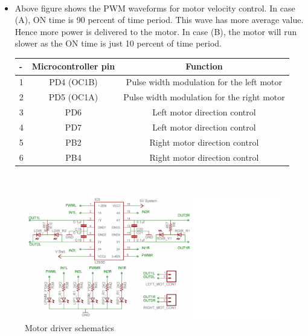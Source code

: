 \documentclass[a4paper,12pt,oneside]{book}
\begin{document}
	\hfill\\
	\begin{itemize}
	\item {Above figure shows the PWM waveforms for motor velocity control. In case (A), ON time is 90 percent of time period. This wave has more average value. Hence more power is delivered to the
	motor. In case (B), the motor will run slower as the ON time is just 10 percent of time period.}

	\begin{tabular*}{\textwidth}{|l|c|c|}
	\hline
	- & Microcontroller pin & Function \\
	\hline
	1 & PD4 (OC1B) & Pulse width modulation for the left motor\\
	\hline
	2 & PD5 (OC1A) & Pulse width modulation for the right motor\\
	\hline
	3 & PD6 & Left motor direction control \\
	\hline
	4 & PD7 & Left motor direction control \\
	\hline
	5 & PB2 & Right motor direction control \\
	\hline
	6 & PB4 & Right motor direction control \\
	\hline
	\end{tabular*}

	\end{itemize}
	\newpage
	\hfill\\
	\begin{figure}[h!]
		\caption{Motor driver schematics}
		\includegraphics[width=\textwidth]{./HardwareManual/l293d.png}
	\end{figure}
	\hfill\\
	
\end{document}

